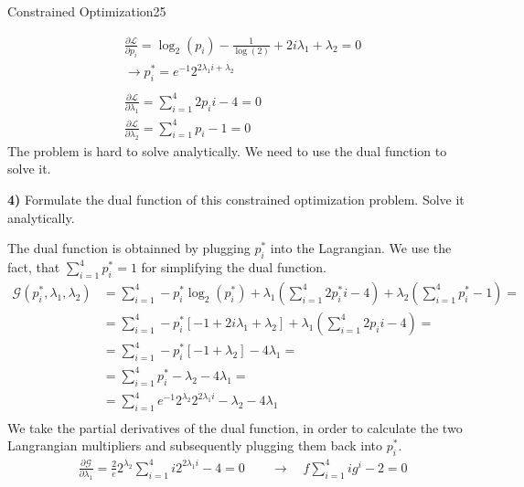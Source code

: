 \begin{questions}
\begin{question}{Constrained Optimization}{25}
\begin{answer}
\begin{equation*}
\begin{split}
& \frac{\partial\mathcal{L}}{\partial p_{i}}= \log_{2}(p_{i}) - \frac{1}{\log(2)}+2i\lambda_{1}+\lambda_{2} = 0 \\
& \rightarrow p_{i}^{*} = e^{-1}2^{2\lambda_{1}i+\lambda_{2}}\\ \\
& \frac{\partial\mathcal{L}}{\partial \lambda_{1}} = \sum_{i=1}^4 2p_{i}i - 4 = 0 \\
& \frac{\partial\mathcal{L}}{\partial \lambda_{2}} = \sum_{i=1}^4 p_{i} - 1 = 0
\end{split}
\end{equation*}
The problem is hard to solve analytically. We need to use the dual function to solve it.
\end{answer}
\textbf{4)} Formulate the dual function of this constrained optimization problem. Solve it analytically.
\\
\begin{answer}
The dual function is obtainned by plugging $p_{i}^{*}$ into the Lagrangian. We use the fact, that $\sum_{i=1}^4 p_{i}^{*} = 1$ for simplifying the dual function.\\
\begin{equation*}
\begin{split}
\mathcal{G}(p_{i}^{*},\lambda_{1},\lambda_{2}) &= \sum_{i=1}^4 - p_{i}^{*}\log_{2}(p_{i}^{*}) + \lambda_{1}(\sum_{i=1}^4 2p_{i}^{*}i - 4)+ \lambda_{2}(\sum_{i=1}^4 p_{i}^{*} - 1) = \\
& = \sum_{i=1}^4 - p_i^*[-1+2i\lambda_1+\lambda_2]+\lambda_1(\sum_{i=1}^4 2p_{i}i - 4) = \\
& = \sum_{i=1}^4 - p_i^*[-1+\lambda_2]-4\lambda_1 = \\
& = \sum_{i=1}^4 p_i^*-\lambda_2-4\lambda_1 = \\
& = \sum_{i=1}^4 e^{-1}2^{\lambda_2}2^{2\lambda_1i}-\lambda_2-4\lambda_1 \\
\end{split}
\end{equation*} 
We take the partial derivatives of the dual function, in order to calculate the two Langrangian multipliers and subsequently plugging them back into $p_{i}^{*}$.
\begin{equation*}
\begin{split}
& \frac{\partial\mathcal{G}}{\partial \lambda_1} = \frac{2}{e}2^{\lambda_2}\sum_{i=1}^4i2^{2\lambda_1i}-4 = 0 \qquad \rightarrow \quad  f\sum_{i=1}^4 i g^i -2 = 0 \\

\end{split}
\end{equation*}
\end{answer}
\end{question}
\end{questions}
